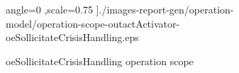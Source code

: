 \begin{figure}[htbp]
\begin{center}
angle=0
,scale=0.75
]{./images-report-gen/operation-model/operation-scope-outactActivator-oeSollicitateCrisisHandling.eps}
\end{center}
\caption[lu.uni.lassy.excalibur.examples.icrash Operation Scope: operation-scope-outactActivator-oeSollicitateCrisisHandling]{oeSollicitateCrisisHandling operation scope
}
\label{fig:lu.uni.lassy.excalibur.examples.icrash-OM-scopeView-operation-scope-outactActivator-oeSollicitateCrisisHandling}
\end{figure}
\vspace{0.5cm}

